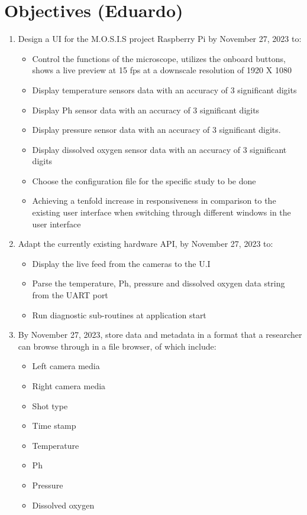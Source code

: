 \section{Objectives (Eduardo)}
\begin{enumerate}
    \item Design a UI for the M.O.S.I.S project Raspberry Pi by November 27, 2023 to:
    \begin{itemize}
        \item Control the functions of the microscope, utilizes the onboard buttons, shows a live preview at 15 fps at a downscale resolution of 1920 X 1080
        \item Display temperature sensors data with an accuracy of 3 significant digits
        \item Display Ph sensor data with an accuracy of 3 significant digits
        \item Display pressure sensor data with an accuracy of 3 significant digits.
        \item Display dissolved oxygen sensor data with an accuracy of 3 significant digits
        \item Choose the configuration file for the specific study to be done
        \item Achieving a tenfold increase in responsiveness in comparison to the existing user interface when switching through different windows in the user interface
    \end{itemize} 
    \item Adapt the currently existing hardware API, by November 27, 2023 to:
    \begin{itemize}
        \item Display the live feed from the cameras to the U.I 
        \item Parse the temperature, Ph, pressure and dissolved oxygen data string from the UART port
        \item Run diagnostic sub-routines at application start
    \end{itemize}
    \item By November 27, 2023, store data and metadata in a format that a researcher can browse through in a file browser, of which include:
    \begin{itemize}
        \item Left camera media
        \item Right camera media
        \item Shot type
        \item Time stamp
        \item Temperature
        \item Ph
        \item Pressure
        \item Dissolved oxygen
    \end{itemize}
\end{enumerate}